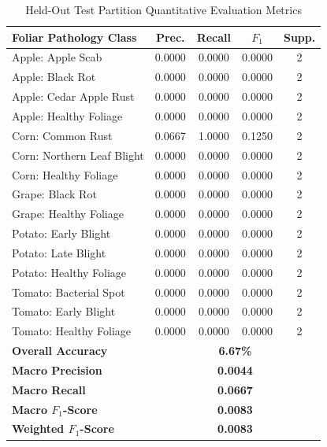 \documentclass[11pt,a4paper]{article}
\begin{document}
\begin{table}[htbp]
\centering
\caption{Held-Out Test Partition Quantitative Evaluation Metrics}
\label{tab:test_metrics_full}
\footnotesize
\begin{tabular}{l c c c c}
\toprule
\textbf{Foliar Pathology Class} & \textbf{Prec.} & \textbf{Recall} & \textbf{$F_1$} & \textbf{Supp.} \\
\midrule
Apple: Apple Scab & 0.0000 & 0.0000 & 0.0000 & 2 \\
Apple: Black Rot & 0.0000 & 0.0000 & 0.0000 & 2 \\
Apple: Cedar Apple Rust & 0.0000 & 0.0000 & 0.0000 & 2 \\
Apple: Healthy Foliage & 0.0000 & 0.0000 & 0.0000 & 2 \\
Corn: Common Rust & 0.0667 & 1.0000 & 0.1250 & 2 \\
Corn: Northern Leaf Blight & 0.0000 & 0.0000 & 0.0000 & 2 \\
Corn: Healthy Foliage & 0.0000 & 0.0000 & 0.0000 & 2 \\
Grape: Black Rot & 0.0000 & 0.0000 & 0.0000 & 2 \\
Grape: Healthy Foliage & 0.0000 & 0.0000 & 0.0000 & 2 \\
Potato: Early Blight & 0.0000 & 0.0000 & 0.0000 & 2 \\
Potato: Late Blight & 0.0000 & 0.0000 & 0.0000 & 2 \\
Potato: Healthy Foliage & 0.0000 & 0.0000 & 0.0000 & 2 \\
Tomato: Bacterial Spot & 0.0000 & 0.0000 & 0.0000 & 2 \\
Tomato: Early Blight & 0.0000 & 0.0000 & 0.0000 & 2 \\
Tomato: Healthy Foliage & 0.0000 & 0.0000 & 0.0000 & 2 \\
\midrule
\textbf{Overall Accuracy} & \multicolumn{4}{c}{\textbf{6.67\%}} \\
\textbf{Macro Precision} & \multicolumn{4}{c}{\textbf{0.0044}} \\
\textbf{Macro Recall} & \multicolumn{4}{c}{\textbf{0.0667}} \\
\textbf{Macro $F_1$-Score} & \multicolumn{4}{c}{\textbf{0.0083}} \\
\textbf{Weighted $F_1$-Score} & \multicolumn{4}{c}{\textbf{0.0083}} \\
\bottomrule
\end{tabular}
\end{table}
\end{document}
